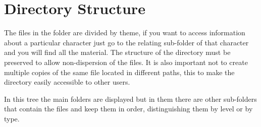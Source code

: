 \section{Directory Structure}
The files in the folder are divided by theme, if you want to access information about a particular character just go to the relating sub-folder of that character and you will find all the material.
The structure of the directory must be preserved to allow non-dispersion of the files. It is also important not to create multiple copies of the same file located in different paths, this to make the directory easily accessible to other users.

\vspace*{0.5cm}

\vspace*{0.5cm}
In this tree the main folders are displayed but in them there are other sub-folders that contain the files and keep them in order, distinguishing them by level or by type.